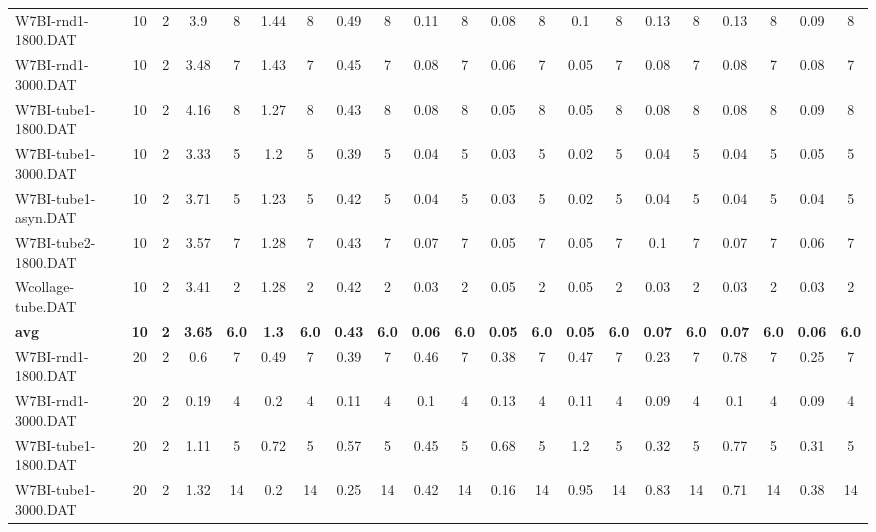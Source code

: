 \begin{sidewaystable}[!ht]
{\begin{tabular}{lcccccccccccccccccccc}
W7BI-rnd1-1800.DAT & 10 & 2 & 3.9 & 8 & 1.44 & 8 & 0.49 & 8 & 0.11 & 8 &  \textcolor{blue2}{0.08} & 8 & 0.1 & 8 & 0.13 & 8 & 0.13 & 8 & 0.09 & 8 \\
W7BI-rnd1-3000.DAT & 10 & 2 & 3.48 & 7 & 1.43 & 7 & 0.45 & 7 & 0.08 & 7 & 0.06 & 7 &  \textcolor{blue2}{0.05} & 7 & 0.08 & 7 & 0.08 & 7 & 0.08 & 7 \\
W7BI-tube1-1800.DAT & 10 & 2 & 4.16 & 8 & 1.27 & 8 & 0.43 & 8 & 0.08 & 8 &  \textcolor{blue2}{0.05} & 8 &  \textcolor{blue2}{0.05} & 8 & 0.08 & 8 & 0.08 & 8 & 0.09 & 8 \\
W7BI-tube1-3000.DAT & 10 & 2 & 3.33 & 5 & 1.2 & 5 & 0.39 & 5 & 0.04 & 5 & 0.03 & 5 &  \textcolor{blue2}{0.02} & 5 & 0.04 & 5 & 0.04 & 5 & 0.05 & 5 \\
W7BI-tube1-asyn.DAT & 10 & 2 & 3.71 & 5 & 1.23 & 5 & 0.42 & 5 & 0.04 & 5 & 0.03 & 5 &  \textcolor{blue2}{0.02} & 5 & 0.04 & 5 & 0.04 & 5 & 0.04 & 5 \\
W7BI-tube2-1800.DAT & 10 & 2 & 3.57 & 7 & 1.28 & 7 & 0.43 & 7 & 0.07 & 7 &  \textcolor{blue2}{0.05} & 7 &  \textcolor{blue2}{0.05} & 7 & 0.1 & 7 & 0.07 & 7 & 0.06 & 7 \\
Wcollage-tube.DAT & 10 & 2 & 3.41 & 2 & 1.28 & 2 & 0.42 & 2 &  \textcolor{blue2}{0.03} & 2 & 0.05 & 2 & 0.05 & 2 &  \textcolor{blue2}{0.03} & 2 &  \textcolor{blue2}{0.03} & 2 &  \textcolor{blue2}{0.03} & 2 \\
\cline{1-21} \textbf{avg} & \textbf{10} & \textbf{2} & \textbf{3.65} & \textbf{6.0} & \textbf{1.3} & \textbf{6.0} & \textbf{0.43} & \textbf{6.0} & \textbf{0.06} & \textbf{6.0} & \textbf{0.05} & \textbf{6.0} & \textbf{0.05} & \textbf{6.0} & \textbf{0.07} & \textbf{6.0} & \textbf{0.07} & \textbf{6.0} & \textbf{0.06} & \textbf{6.0} \\ \cline{1-21}
W7BI-rnd1-1800.DAT & 20 & 2 & 0.6 & 7 & 0.49 & 7 & 0.39 & 7 & 0.46 & 7 & 0.38 & 7 & 0.47 & 7 &  \textcolor{blue2}{0.23} & 7 & 0.78 & 7 & 0.25 & 7 \\
W7BI-rnd1-3000.DAT & 20 & 2 & 0.19 & 4 & 0.2 & 4 & 0.11 & 4 & 0.1 & 4 & 0.13 & 4 & 0.11 & 4 &  \textcolor{blue2}{0.09} & 4 & 0.1 & 4 &  \textcolor{blue2}{0.09} & 4 \\
W7BI-tube1-1800.DAT & 20 & 2 & 1.11 & 5 & 0.72 & 5 & 0.57 & 5 & 0.45 & 5 & 0.68 & 5 & 1.2 & 5 & 0.32 & 5 & 0.77 & 5 &  \textcolor{blue2}{0.31} & 5 \\
W7BI-tube1-3000.DAT & 20 & 2 & 1.32 & 14 & 0.2 & 14 & 0.25 & 14 & 0.42 & 14 &  \textcolor{blue2}{0.16} & 14 & 0.95 & 14 & 0.83 & 14 & 0.71 & 14 & 0.38 & 14 \\

\end{tabular}}
\end{sidewaystable}
